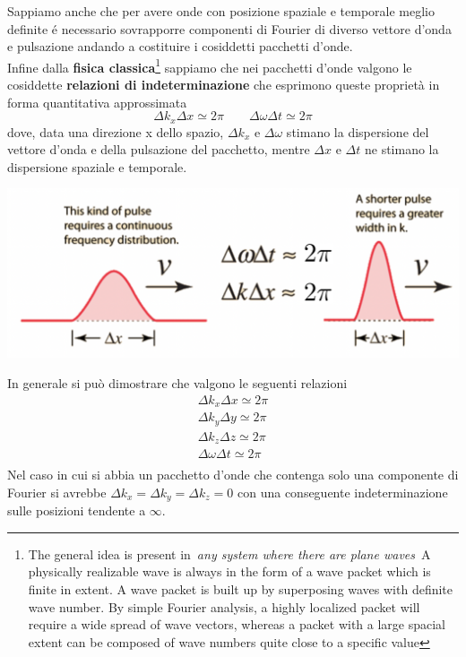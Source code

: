 Sappiamo anche che per avere onde con posizione spaziale e temporale
meglio definite é necessario sovrapporre componenti di Fourier di
diverso vettore d'onda e pulsazione andando a costituire i cosiddetti
pacchetti d'onde.\\
Infine dalla \textbf{fisica classica}\footnote{The general idea is
present in~\emph{any system where there are plane waves}~A physically
realizable wave is always in the form of a wave packet which is finite
in extent. A wave packet is built up by superposing waves with
definite wave number. By simple Fourier analysis, a highly localized
packet will require a wide spread of wave vectors, whereas a packet
with a large spacial extent can be composed of wave numbers quite
close to a specific value} sappiamo che nei pacchetti d'onde valgono
le cosiddette \textbf{relazioni di indeterminazione} che esprimono
queste proprietà in forma quantitativa approssimata \[
                                                         \Delta k_{x} \Delta x \simeq2 \pi \qquad \Delta \omega \Delta t \simeq2 \pi
\] dove, data una direzione x dello spazio, \(\Delta k_{x}\) e
\(\Delta \omega\) stimano la dispersione del vettore d'onda e della
pulsazione del pacchetto, mentre \(\Delta x\) e \(\Delta t\) ne stimano
la dispersione spaziale e temporale.

\begin{marginfigure}
    \includegraphics{figs/rel-indet}
    \label{fig:rel-indet}
\end{marginfigure}

In generale si può dimostrare che valgono le seguenti relazioni \begin{gather*}
    \Delta k_{x} \Delta x \simeq2 \pi\\
    \Delta k_{y} \Delta y \simeq2 \pi\\
    \Delta k_{z} \Delta z \simeq2 \pi\\
    \Delta \omega \Delta t \simeq2 \pi\\
\end{gather*} Nel caso in cui si abbia un pacchetto d'onde che contenga solo una
componente di Fourier si avrebbe
\(\Delta k_{x} = \Delta k_{y} = \Delta k_{z} = 0\) con una conseguente
indeterminazione sulle posizioni tendente a \(\infty\).


